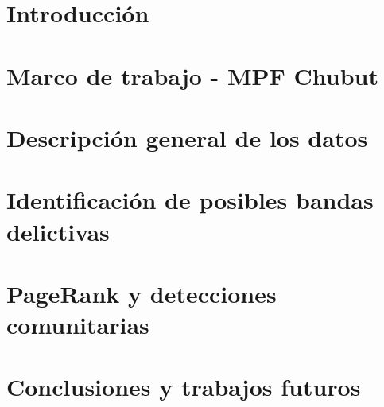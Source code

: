 \documentclass[runningheads,a4paper]{llncs}
\begin{document}

\maketitle              %

%

%
\section{Introducción}


\section{Marco de trabajo - MPF Chubut}


\section{Descripción general de los datos}


\section{Identificación de posibles bandas delictivas}


\section{PageRank y detecciones comunitarias}




\section{Conclusiones y trabajos futuros}





\end{document}
